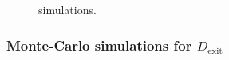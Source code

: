 \documentclass[11pt]{article}
\begin{document}
\begin{figure}[h]
\caption{simulations.}
\label{fig:ROCdentry}
\end{figure}


\subsubsection{Monte-Carlo simulations for $D_{\text{exit}}$}
\label{subsubsec:exitDetector_working}
\end{document}
